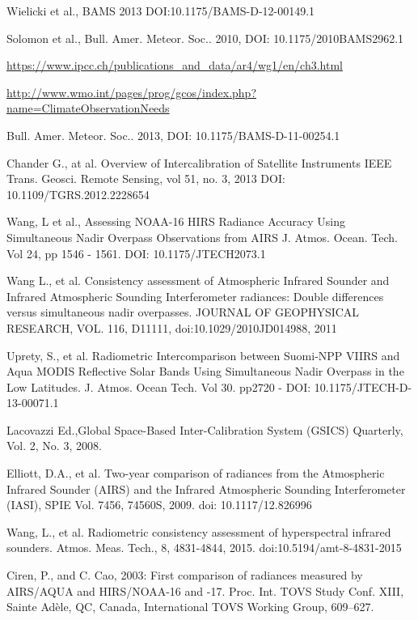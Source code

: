 \documentclass[twocolumn,10pt]{article}
\begin{document}
\begin{thebibliography}{9}

  Wielicki et al.,
  BAMS 2013
  DOI:10.1175/BAMS-D-12-00149.1

  Solomon et al.,
  Bull. Amer. Meteor. Soc.. 2010, 
  DOI: 10.1175/2010BAMS2962.1

 \url{https://www.ipcc.ch/publications_and_data/ar4/wg1/en/ch3.html}

 \url{http://www.wmo.int/pages/prog/gcos/index.php?name=ClimateObservationNeeds}

  Bull. Amer. Meteor. Soc.. 2013, 
  DOI: 10.1175/BAMS-D-11-00254.1

  Chander G., at al.
  Overview of Intercalibration of Satellite Instruments
  IEEE Trans. Geosci. Remote Sensing, vol 51, no. 3, 2013
  DOI: 10.1109/TGRS.2012.2228654
  
  Wang, L et al., 
  Assessing NOAA-16 HIRS Radiance Accuracy Using Simultaneous Nadir Overpass Observations from AIRS
  J. Atmos. Ocean. Tech. Vol 24, pp 1546 - 1561.
  DOI: 10.1175/JTECH2073.1

  Wang L., et al. 
  Consistency assessment of Atmospheric Infrared Sounder and Infrared Atmospheric Sounding Interferometer radiances: Double differences versus simultaneous nadir overpasses.
 JOURNAL OF GEOPHYSICAL RESEARCH, VOL. 116, D11111,
 doi:10.1029/2010JD014988, 2011

  Uprety, S., et al. 
  Radiometric Intercomparison between Suomi-NPP VIIRS and Aqua MODIS Reflective Solar Bands Using   Simultaneous Nadir Overpass in the Low Latitudes.
  J. Atmos. Ocean Tech. Vol 30. pp2720 - 
  DOI: 10.1175/JTECH-D-13-00071.1

  Lacovazzi Ed.,Global Space-Based Inter-Calibration System (GSICS) Quarterly,
  Vol. 2, No. 3, 2008.

  Elliott, D.A., et al.
  Two-year comparison of radiances from the Atmospheric Infrared Sounder (AIRS) and the Infrared Atmospheric Sounding Interferometer (IASI),
  SPIE Vol. 7456, 74560S, 2009.
  doi: 10.1117/12.826996

  Wang, L., et al. Radiometric consistency assessment of hyperspectral infrared sounders.
  Atmos. Meas. Tech., 8, 4831-4844, 2015.
  doi:10.5194/amt-8-4831-2015

  Ciren, P., and C. Cao, 2003: First comparison of radiances measured by AIRS/AQUA and HIRS/NOAA-16 and -17. 
  Proc. Int. TOVS Study Conf. XIII, Sainte Adèle, QC, Canada, International TOVS Working Group, 609–627.


\end{thebibliography}
\end{document}
